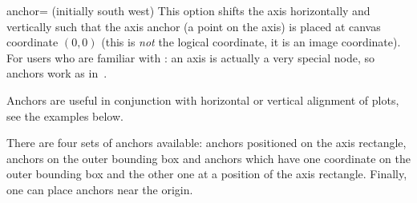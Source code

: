 \begin{pgfplotskey}{anchor= (initially south west)}
\label{option:anchor}%
This option shifts the axis horizontally and vertically such that the axis anchor (a point on the axis) is placed at canvas coordinate $(0,0)$ (this is \emph{not} the logical coordinate, it is an image coordinate). For users who are familiar with \Tikz: an axis is actually a very special node, so anchors work as in~\cite{tikz}.

Anchors are useful in conjunction with horizontal or vertical alignment of plots, see the examples below.

There are four sets of anchors available: anchors positioned on the axis rectangle, anchors on the outer bounding box and anchors which have one coordinate on the outer bounding box and the other one at a position of the axis rectangle. Finally, one can place anchors near the origin.


\end{pgfplotskey}
